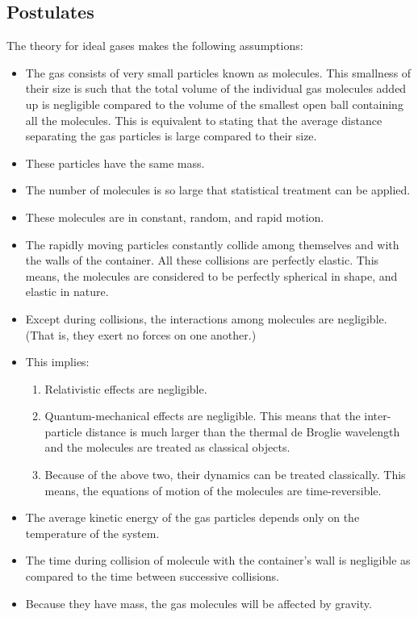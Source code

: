 \subsection{Postulates}
The theory for ideal gases makes the following assumptions:
\begin{itemize}
\item The gas consists of very small particles known as molecules. This smallness of their size is such that the total volume of the individual gas molecules added up is negligible compared to the volume of the smallest open ball containing all the molecules. This is equivalent to stating that the average distance separating the gas particles is large compared to their size.
%
\item These particles have the same mass.
\item The number of molecules is so large that statistical treatment can be applied.
\item These molecules are in constant, random, and rapid motion.
\item The rapidly moving particles constantly collide among themselves and with the walls of the container. All these collisions are perfectly elastic. This means, the molecules are considered to be perfectly spherical in shape, and elastic in nature.
%
\item Except during collisions, the interactions among molecules are negligible. (That is, they exert no forces on one another.)
%
\item This implies:
\begin{enumerate}
\item Relativistic effects are negligible.
%
\item Quantum-mechanical effects are negligible. This means that the inter-particle distance is much larger than the thermal de Broglie wavelength and the molecules are treated as classical objects.
%
\item Because of the above two, their dynamics can be treated classically. This means, the equations of motion of the molecules are time-reversible.
\end{enumerate}
%
\item The average kinetic energy of the gas particles depends only on the temperature of the system.
%
\item The time during collision of molecule with the container's wall is negligible as compared to the time between successive collisions.
%
\item Because they have mass, the gas molecules will be affected by gravity.
\end{itemize}

